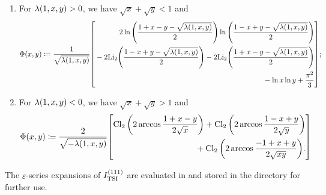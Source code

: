 \documentclass{article}
\begin{document}
            \begin{enumerate}
                \item For $\lambdaFun{1, x, y} > 0$, we have $\sqrt{x} + \sqrt{y} < 1$ and
                    \begin{equation}
                        \Phi(x, y) \coloneq \frac{1}{\sqrt{\lambdaFun{1, x, y}}} \qty[
                            \begin{aligned}
                                2 \ln\qty(\frac{1 + x - y - \sqrt{\lambdaFun{1, x, y}}}{2}) \ln\qty(\frac{1 - x + y - \sqrt{\lambdaFun{1, x, y}}}{2}) \\
                                {} - 2 \Li[2]{\frac{1 - x + y - \sqrt{\lambdaFun{1, x, y}}}{2}} - 2 \Li[2]{\frac{1 + x - y - \sqrt{\lambdaFun{1, x, y}}}{2}} \\
                                {} - \ln x \ln y + \frac{\pi^2}{3}
                            \end{aligned}
                        ];
                    \end{equation}
                \item For $\lambdaFun{1, x, y} < 0$, we have $\sqrt{x} + \sqrt{y} > 1$ and
                    \begin{equation}
                        \Phi(x, y) \coloneq \frac{2}{\sqrt{-\lambdaFun{1, x, y}}} \qty[
                            \begin{aligned}
                                \operatorname{Cl}_2\qty(2 \arccos \frac{1 + x - y}{2 \sqrt{x}}) + \operatorname{Cl}_2\qty(2 \arccos \frac{1 - x + y}{2 \sqrt{y}}) \\
                                {} + \operatorname{Cl}_2\qty(2 \arccos \frac{-1 + x + y}{2 \sqrt{x y}}).
                            \end{aligned}
                        ]
                    \end{equation}
            \end{enumerate}
            The $\varepsilon$-series expansions of $\TSI{111}$ are evaluated in  and stored in the directory  for further use.
\end{document}
